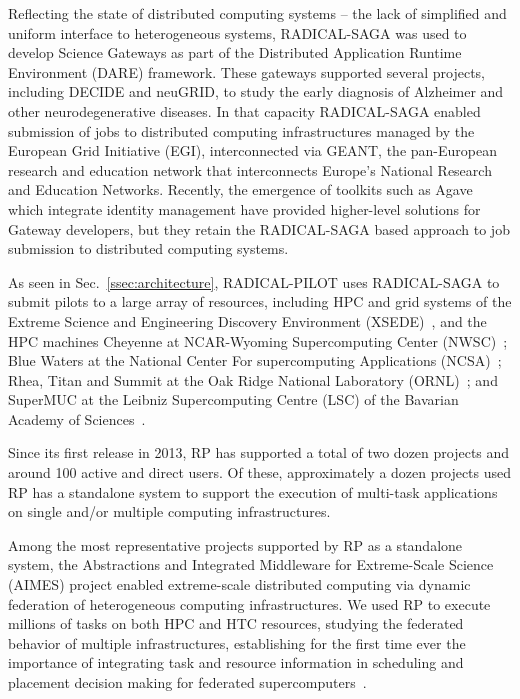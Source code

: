 \documentclass[preprint,12pt, a4paper]{elsarticle}
\begin{document}


Reflecting the state of distributed computing systems -- the lack of
simplified and uniform interface to heterogeneous systems, RADICAL-SAGA was
used to develop Science Gateways as part of the Distributed Application
Runtime Environment (DARE) framework. These gateways supported several
projects, including DECIDE and neuGRID, to study the early diagnosis of
Alzheimer and other neurodegenerative diseases. In that capacity RADICAL-SAGA
enabled submission of jobs to distributed computing infrastructures managed by
the European Grid Initiative (EGI), interconnected via GEANT, the pan-European
research and education network that interconnects Europe’s National Research
and Education Networks. Recently, the emergence of toolkits such as Agave
which integrate identity management have provided higher-level solutions for
Gateway developers, but they retain the RADICAL-SAGA based approach to job
submission to distributed computing systems.



As seen in Sec.~\ref{ssec:architecture}, RADICAL-PILOT uses RADICAL-SAGA to
submit pilots to a large array of resources, including HPC and grid systems
of the Extreme Science and Engineering Discovery Environment
(XSEDE)~\citep{towns2014xsede}, and the HPC machines Cheyenne at NCAR-Wyoming
Supercomputing Center (NWSC)~\citep{web-cheyenne}; Blue Waters at the
National Center For supercomputing Applications
(NCSA)~\citep{web-bluewaters}; Rhea, Titan and Summit at the Oak Ridge
National Laboratory (ORNL)~\citep{web-olcf-resources}; and SuperMUC at the
Leibniz Supercomputing Centre (LSC) of the Bavarian Academy of
Sciences~\citep{web-supermuc}.

Since its first release in 2013, RP has supported a total of two dozen
projects and around 100 active and direct users. Of these, approximately a
dozen projects used RP has a standalone system to support the execution of
multi-task applications on single and/or multiple computing infrastructures.


Among the most representative projects supported by RP as a standalone system,
the Abstractions and Integrated Middleware for Extreme-Scale Science (AIMES)
project enabled extreme-scale distributed computing via dynamic federation of
heterogeneous computing infrastructures. We used RP to execute millions of
tasks on both HPC and HTC resources, studying the federated behavior of
multiple infrastructures, establishing for the first time ever the importance
of integrating task and resource information in scheduling and placement
decision making for federated supercomputers~\citep{}.
\end{document}
